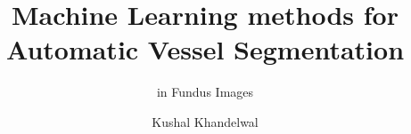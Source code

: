 \title{Machine Learning methods for Automatic Vessel Segmentation}

\subtitle{in Fundus Images}

\author{Kushal Khandelwal}



\renewcommand{\submissiontext}{This thesis is submitted in partial fulfillment of the requirements of the course BITS C422T}




\subject{LaTeX} 
